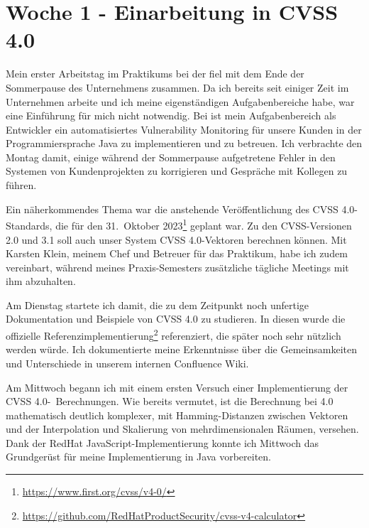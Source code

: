 \section{Woche 1 - Einarbeitung in CVSS 4.0} \label{sec:bericht-wo-1}


\lweekdaymarginpar{\weekdayMondayLong}

Mein erster Arbeitstag im Praktikums bei der {\metaeffekt} fiel mit dem Ende der Sommerpause des Unternehmens zusammen.
Da ich bereits seit einiger Zeit im Unternehmen arbeite und ich meine eigenständigen Aufgabenbereiche habe, war eine Einführung für mich nicht notwendig.
Bei {\metaeffekt} ist mein Aufgabenbereich als Entwickler ein automatisiertes Vulnerability Monitoring für unsere Kunden in der Programmiersprache Java zu implementieren und zu betreuen.
Ich verbrachte den Montag damit, einige während der Sommerpause aufgetretene Fehler in den Systemen von Kundenprojekten zu korrigieren und Gespräche mit Kollegen zu führen.

Ein näherkommendes Thema war die anstehende Veröffentlichung des CVSS 4.0-Standards, die für den 31.\ Oktober 2023\footnote{\url{https://www.first.org/cvss/v4-0/}} geplant war.
Zu den CVSS-Versionen 2.0 und 3.1 soll auch unser System CVSS 4.0-Vektoren berechnen können.
Mit Karsten Klein, meinem Chef und Betreuer für das Praktikum, habe ich zudem vereinbart, während meines Praxis-Semesters zusätzliche tägliche Meetings mit ihm abzuhalten.

\sweekdaymarginpar{\weekdayTuesdayLong}

Am Dienstag startete ich damit, die zu dem Zeitpunkt noch unfertige Dokumentation und Beispiele von CVSS 4.0 zu studieren.
In diesen wurde die offizielle Referenzimplementierung\footnote{\url{https://github.com/RedHatProductSecurity/cvss-v4-calculator}} referenziert, die später noch sehr nützlich werden würde.
Ich dokumentierte meine Erkenntnisse über die Gemeinsamkeiten und Unterschiede in unserem internen Confluence Wiki.

\sweekdaymarginpar{\weekdayWednesdayLong}

Am Mittwoch begann ich mit einem ersten Versuch einer Implementierung der CVSS 4.0-\ Berechnungen.
Wie bereits vermutet, ist die Berechnung bei 4.0 mathematisch deutlich komplexer, mit Hamming-Distanzen zwischen Vektoren und der Interpolation und Skalierung von mehrdimensionalen Räumen, versehen.
Dank der RedHat JavaScript-Implementierung konnte ich Mittwoch das Grundgerüst für meine Implementierung in Java vorbereiten.

